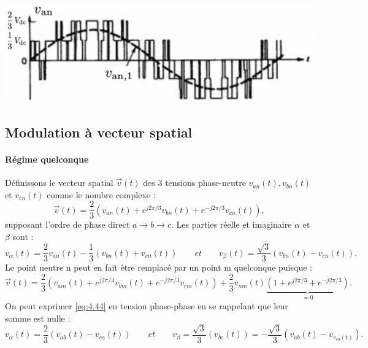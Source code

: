 	\begin{center}
		\includegraphics[scale=0.5]{ch4/25}
	\end{center}
	
	\subsection{Modulation à vecteur spatial}
		\paragraph{Régime quelconque}\quad Définissons le vecteur spatial $\vec{v}(t)$ des 3 tensions phase-neutre $v_{an}(t), v_{bn}(t)$ et $v_{cn}(t)$ comme le nombre complexe : 
		\begin{equation}
			\vec{v}(t) = \frac{2}{3} \left( v_{an}(t) + e^{j2\pi/3}v_{bn}(t)+ e^{-j2\pi/3}v_{cn}(t) \right),
		\end{equation}
		supposant l'ordre de phase direct $a\rightarrow b \rightarrow c$. Les parties réelle et imaginaire $\alpha$ et $\beta$ sont :
		\begin{equation}
			v_{\alpha}(t) = \frac{2}{3} v_{an}(t) - \frac{1}{3}(v_{bn}(t) + v_{cn}(t)) \qquad et \qquad v_{\beta}(t) = \frac{\sqrt{3}}{3}(v_{bn}(t) - v_{cn}(t)).
			\label{eq:4.44}
		\end{equation}
		Le point neutre n peut en fait être remplacé par un point m quelconque puisque :
		\begin{equation}
			\vec{v}(t) = \frac{2}{3} \left( v_{am}(t) + e^{j2\pi/3}v_{bm}(t)+ e^{-j2\pi/3}v_{cm}(t) \right) + \frac{2}{3}v_{nm}(t) \underbrace{\left( 1+e^{j2\pi/3} + e^{-j2\pi/3}\right)}_{=0}. 
		\end{equation}
		On peut exprimer \eqref{eq:4.44} en tension phase-phase en se rappelant que leur somme est nulle : 
		\begin{equation}
			v_\alpha (t) = \frac{2}{3}(v_{ab}(t) - v_{ca}(t)) \qquad et \qquad v_\beta = \frac{\sqrt{3}}{3}(v_{bc}(t))= -\frac{\sqrt{3}}{3}(v_{ab}(t)-v_{v_{ca}(t)}).
		\end{equation}
		
